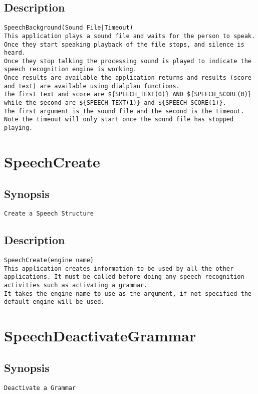 \subsection{Description}
\begin{verbatim}
SpeechBackground(Sound File|Timeout)
This application plays a sound file and waits for the person to speak. Once they start speaking playback of the file stops, and silence is heard.
Once they stop talking the processing sound is played to indicate the speech recognition engine is working.
Once results are available the application returns and results (score and text) are available using dialplan functions.
The first text and score are ${SPEECH_TEXT(0)} AND ${SPEECH_SCORE(0)} while the second are ${SPEECH_TEXT(1)} and ${SPEECH_SCORE(1)}.
The first argument is the sound file and the second is the timeout. Note the timeout will only start once the sound file has stopped playing.

\end{verbatim}


\section{SpeechCreate}
\subsection{Synopsis}
\begin{verbatim}
Create a Speech Structure
\end{verbatim}
\subsection{Description}
\begin{verbatim}
SpeechCreate(engine name)
This application creates information to be used by all the other applications. It must be called before doing any speech recognition activities such as activating a grammar.
It takes the engine name to use as the argument, if not specified the default engine will be used.

\end{verbatim}


\section{SpeechDeactivateGrammar}
\subsection{Synopsis}
\begin{verbatim}
Deactivate a Grammar
\end{verbatim}

